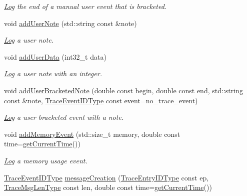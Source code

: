 \begin{DoxyCompactItemize}
\begin{DoxyCompactList}\small\item\em \hyperlink{structvt_1_1trace_1_1_log}{Log} the end of a manual user event that is bracketed. \end{DoxyCompactList}\item 
void \hyperlink{structvt_1_1trace_1_1_trace_a8be5309a84a6d0f99df0eb835fedf3b1}{add\+User\+Note} (std\+::string const \&note)
\begin{DoxyCompactList}\small\item\em \hyperlink{structvt_1_1trace_1_1_log}{Log} a user note. \end{DoxyCompactList}\item 
void \hyperlink{structvt_1_1trace_1_1_trace_a7f5ede52aa552c2eac88b894853a2efe}{add\+User\+Data} (int32\+\_\+t data)
\begin{DoxyCompactList}\small\item\em \hyperlink{structvt_1_1trace_1_1_log}{Log} a user note with an integer. \end{DoxyCompactList}\item 
void \hyperlink{structvt_1_1trace_1_1_trace_acb4416918d08379892bcf9ec85621309}{add\+User\+Bracketed\+Note} (double const begin, double const end, std\+::string const \&note, \hyperlink{namespacevt_1_1trace_a64a7185f3e102df8d8258f263ccd1582}{Trace\+Event\+I\+D\+Type} const event=no\+\_\+trace\+\_\+event)
\begin{DoxyCompactList}\small\item\em \hyperlink{structvt_1_1trace_1_1_log}{Log} a user bracketed event with a note. \end{DoxyCompactList}\item 
void \hyperlink{structvt_1_1trace_1_1_trace_abc497f6fa641ac1c2c20889815b06dbc}{add\+Memory\+Event} (std\+::size\+\_\+t memory, double const time=\hyperlink{structvt_1_1trace_1_1_trace_a04cf6b76b4ced1bc90d246a34c948db5}{get\+Current\+Time}())
\begin{DoxyCompactList}\small\item\em \hyperlink{structvt_1_1trace_1_1_log}{Log} a memory usage event. \end{DoxyCompactList}\item 
\hyperlink{namespacevt_1_1trace_a64a7185f3e102df8d8258f263ccd1582}{Trace\+Event\+I\+D\+Type} \hyperlink{structvt_1_1trace_1_1_trace_a5b5091197568d7ed104bb40d68b4ddd7}{message\+Creation} (\hyperlink{namespacevt_1_1trace_a3c14050715ba9eceaeff51fb3de64f2f}{Trace\+Entry\+I\+D\+Type} const ep, \hyperlink{namespacevt_1_1trace_aeb598f45d67d41db7902e494f2f0ce59}{Trace\+Msg\+Len\+Type} const len, double const time=\hyperlink{structvt_1_1trace_1_1_trace_a04cf6b76b4ced1bc90d246a34c948db5}{get\+Current\+Time}())

\end{DoxyCompactItemize}
